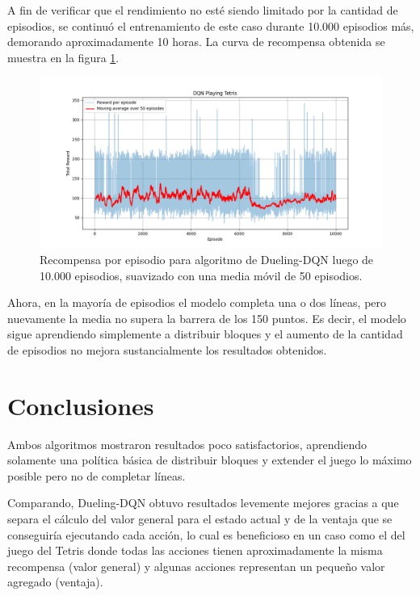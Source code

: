 A fin de verificar que el rendimiento no esté siendo limitado por la cantidad de episodios, se continuó el entrenamiento de este caso durante 10.000 episodios más, demorando aproximadamente 10 horas. La curva de recompensa obtenida se muestra en la figura \ref{fig:dueling_dqn_rewards_10k}.

\begin{figure}[hbt!]
	\centering
	\includegraphics[width=\textwidth]{./Figures/dueling_dqn_rewards_10k.png}
	\caption{Recompensa por episodio para algoritmo de Dueling-DQN luego de 10.000 episodios, suavizado con una media móvil de 50 episodios.}
	\label{fig:dueling_dqn_rewards_10k}
\end{figure}

Ahora, en la mayoría de episodios el modelo completa una o dos líneas, pero nuevamente la media no supera la barrera de los 150 puntos. Es decir, el modelo sigue aprendiendo simplemente a distribuir bloques y el aumento de la cantidad de episodios no mejora sustancialmente los resultados obtenidos.

\section{Conclusiones}
\label{sec:conclusions}

Ambos algoritmos mostraron resultados poco satisfactorios, aprendiendo solamente una política básica de distribuir bloques y extender el juego lo máximo posible pero no de completar líneas. 

Comparando, Dueling-DQN obtuvo resultados levemente mejores gracias a que separa el cálculo del valor general para el estado actual y de la ventaja que se conseguiría ejecutando cada acción, lo cual es beneficioso en un caso como el del juego del Tetris donde todas las acciones tienen aproximadamente la misma recompensa (valor general) y algunas acciones representan un pequeño valor agregado (ventaja).

